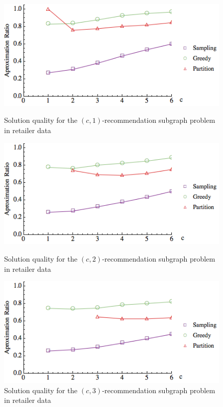 \begin{figure}[h]
\centering
\begin{minipage}[h]{0.48\textwidth}
\centering
\includegraphics[width=0.99\textwidth]{images/real_a=1.png}
\caption{Solution quality for the $(c, 1)$-recommendation subgraph problem in retailer data}
\label{fig:real_a=1}
\end{minipage}

\hspace{0cm}
\begin{minipage}[h]{0.48\textwidth}
\centering
\includegraphics[width=0.99\textwidth]{images/real_a=2.png}
\caption{Solution quality for the $(c, 2)$-recommendation subgraph problem in retailer data}
\label{fig:real_a=2}
\end{minipage}

\hspace{0cm}
\begin{minipage}[h]{0.48\textwidth}
\centering
\includegraphics[width=0.99\textwidth]{images/real_a=3.png}
\caption{Solution quality for the $(c, 3)$-recommendation subgraph problem in retailer data}
\label{fig:real_a=3}
\end{minipage}
\vspace{-.7cm}
\end{figure}

